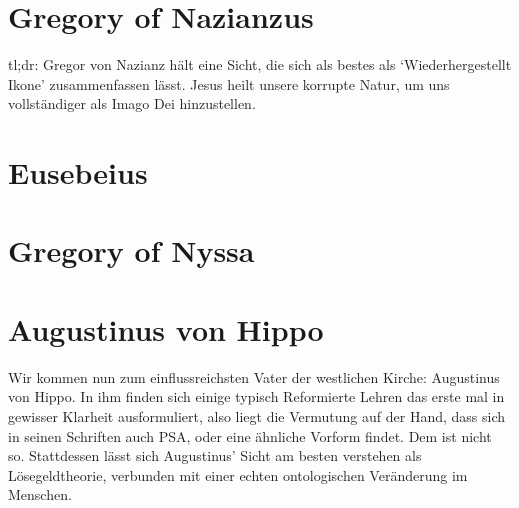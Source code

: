 \section{Gregory of Nazianzus}
tl;dr:
Gregor von Nazianz hält eine Sicht, die sich als bestes als `Wiederhergestellt Ikone' zusammenfassen lässt.
Jesus heilt unsere korrupte Natur, um uns vollständiger als Imago Dei hinzustellen.


\section{Eusebeius}

\section{Gregory of Nyssa}

\section{Augustinus von Hippo}
Wir kommen nun zum einflussreichsten Vater der westlichen Kirche: Augustinus von Hippo.
In ihm finden sich einige typisch Reformierte Lehren das erste mal in gewisser Klarheit ausformuliert,
also liegt die Vermutung auf der Hand, dass sich in seinen Schriften auch PSA, oder eine ähnliche Vorform findet.
Dem ist nicht so.
Stattdessen lässt sich Augustinus' Sicht am besten verstehen als Lösegeldtheorie, verbunden mit einer echten ontologischen Veränderung im Menschen.

